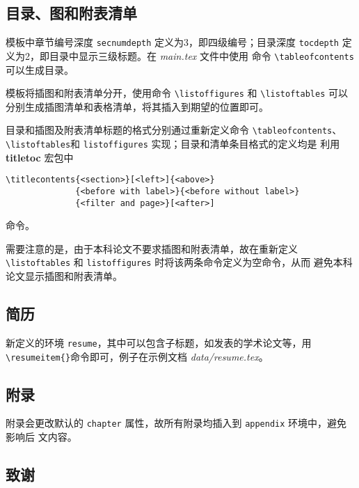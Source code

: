 \subsection*{目录、图和附表清单}

模板中章节编号深度 \texttt{secnumdepth} 定义为3，即四级编号；目录深度
\texttt{tocdepth} 定义为2，即目录中显示三级标题。在 \emph{main.tex} 文件中使用
命令 \verb|\tableofcontents|可以生成目录。

模板将插图和附表清单分开，使用命令 \verb|\listoffigures| 和 \verb|\listoftables|
可以分别生成插图清单和表格清单，将其插入到期望的位置即可。

目录和插图及附表清单标题的格式分别通过重新定义命令 \verb|\tableofcontents|、
\verb|\listoftables|和 \verb|listoffigures| 实现；目录和清单条目格式的定义均是
利用 \textbf{titletoc} 宏包中\\
\begin{verbatim}
\titlecontents{<section>}[<left>]{<above>}
              {<before with label>}{<before without label>}
              {<filter and page>}[<after>]
\end{verbatim}
命令。

需要注意的是，由于本科论文不要求插图和附表清单，故在重新定义
\verb|\listoftables| 和 \verb|listoffigures| 时将该两条命令定义为空命令，从而
避免本科论文显示插图和附表清单。

\subsection*{简历}

新定义的环境 \texttt{resume}，其中可以包含子标题，如发表的学术论文等，用
\verb|\resumeitem{}|命令即可，例子在示例文档 \emph{data/resume.tex}。

\subsection*{附录}

附录会更改默认的 \texttt{chapter} 属性，故所有附录均插入到 \texttt{appendix} 环境中，避免影响后
文内容。
\begin{code}
\begin{appendix}
 
 
\end{appendix}
\end{code}

\subsection*{致谢}

